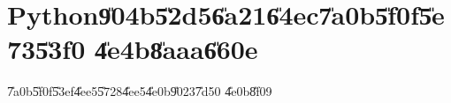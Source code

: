                       

\part{Python\U{904b}\U{52d5}\U{6a21}\U{64ec}\U{7a0b}\U{5f0f}\U{5e73}\U{53f0}%
\U{4e4b}\U{8aaa}\U{660e}}

\setcounter{page}{1}

\bigskip

\U{7a0b}\U{5f0f}\U{53ef}\U{4ee5}\U{5728}\U{4ee5}\U{4e0b}\U{9023}\U{7d50}%
\U{4e0b}\U{8f09}

\href{https://github.com/whymranderson/cordtrans/tree/test_1_github}{%
\underline{\color{blue}%
}}

